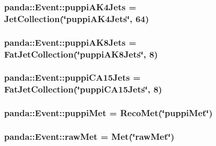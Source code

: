 \label{classpanda_1_1Event_a42e6ea0ac65285f9d35d47db092765c5}
\hypertarget{classpanda_1_1Event_a95bbfc1588846edef19aa3eb3480deff}{
\subsubsection[{puppiAK4Jets}]{ {\bf panda::Event::puppiAK4Jets} = {\bf JetCollection}(\char`\"{}puppiAK4Jets\char`\"{}, 64)}}
\label{classpanda_1_1Event_a95bbfc1588846edef19aa3eb3480deff}
\hypertarget{classpanda_1_1Event_a91c57207214b8717ad431863fc9ecfa2}{
\subsubsection[{puppiAK8Jets}]{ {\bf panda::Event::puppiAK8Jets} = {\bf FatJetCollection}(\char`\"{}puppiAK8Jets\char`\"{}, 8)}}
\label{classpanda_1_1Event_a91c57207214b8717ad431863fc9ecfa2}
\hypertarget{classpanda_1_1Event_ad8c6b6c76a6993c8534468bac18dac25}{
\subsubsection[{puppiCA15Jets}]{ {\bf panda::Event::puppiCA15Jets} = {\bf FatJetCollection}(\char`\"{}puppiCA15Jets\char`\"{}, 8)}}
\label{classpanda_1_1Event_ad8c6b6c76a6993c8534468bac18dac25}
\hypertarget{classpanda_1_1Event_a3bbffdefa6d28927466053f51a1cbae3}{
\subsubsection[{puppiMet}]{ {\bf panda::Event::puppiMet} = {\bf RecoMet}(\char`\"{}puppiMet\char`\"{})}}
\label{classpanda_1_1Event_a3bbffdefa6d28927466053f51a1cbae3}
\hypertarget{classpanda_1_1Event_a860a1e91138f7c8763664d174f2d5e8c}{
\subsubsection[{rawMet}]{ {\bf panda::Event::rawMet} = {\bf Met}(\char`\"{}rawMet\char`\"{})}}
